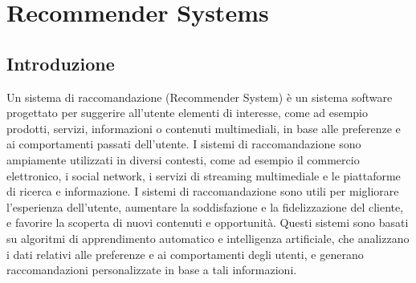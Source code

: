 \section{Recommender Systems}

\subsection{Introduzione}

Un sistema di raccomandazione (Recommender System) \cite{RecommenderOverview} è un sistema software progettato per suggerire all'utente elementi di interesse, come ad esempio prodotti, servizi, informazioni o contenuti multimediali, in base alle preferenze e ai comportamenti passati dell'utente. I sistemi di raccomandazione sono ampiamente utilizzati in diversi contesti, come ad esempio il commercio elettronico, i social network, i servizi di streaming multimediale e le piattaforme di ricerca e informazione. I sistemi di raccomandazione sono utili per migliorare l'esperienza dell'utente, aumentare la soddisfazione e la fidelizzazione del cliente, e favorire la scoperta di nuovi contenuti e opportunità.
Questi sistemi sono basati su algoritmi di apprendimento automatico e intelligenza artificiale, che analizzano i dati relativi alle preferenze e ai comportamenti degli utenti, e generano raccomandazioni personalizzate in base a tali informazioni.\\

